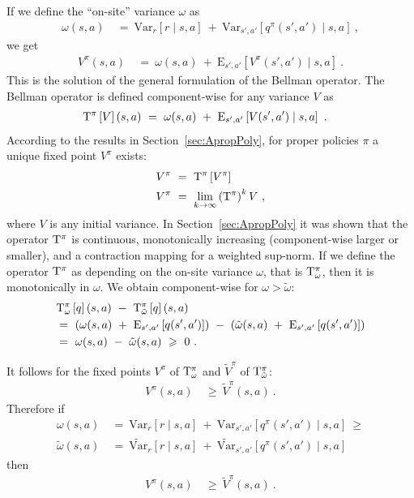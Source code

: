 \documentclass{article}
\newcommand\EXP{\mathbf{\mathrm{E}}}
\newcommand\VAR{\mathbf{\mathrm{Var}}}
\renewcommand{\geq}{\geqslant}
\begin{document}
\begin{appendices}
If we define the ``on-site'' variance $\omega$ as
\begin{align}
  \omega(s,a) \ &= \ \VAR_r \left[ r \mid s,a \right] \ + \
  \VAR_{s',a'} \left[q^\pi(s', a') \mid s,a\right] \ ,
\end{align}
we get
\begin{align}
  V^{\pi}(s,a) \ &= \  \omega(s,a)  \ + \ 
    \EXP_{s',a'}  \left[V^{\pi}(s',a') \mid s,a\right]  \ .  
\end{align}
This is the solution of the
general formulation of the
Bellman operator. The Bellman operator
is defined component-wise for any variance $V$ as
\begin{align}
  \rT^\pi \left[ V \right] (s,a) \ &= \
  \omega(s,a)  \ + \ 
    \EXP_{s',a'}  \left[V(s',a') \mid s,a\right]  \ . 
\end{align}
According to the results in Section~\ref{sec:ApropPoly},
for proper policies $\pi$ a unique fixed point $V^\pi$ exists:
\begin{align}
  V^\pi \ &= \ \mathrm{T}^\pi \left[ V^\pi\right] \\
  V^\pi \ &= \ \lim_{k\to \infty} \left(\mathrm{T}^\pi\right)^k V  \ ,
\end{align}
where $V$ is any initial variance.
In Section~\ref{sec:ApropPoly} it was shown that
the operator $\mathrm{T}^\pi$ is
continuous, monotonically increasing (component-wise larger or smaller),
and a contraction mapping for
a weighted sup-norm. If we define the operator $\mathrm{T}^\pi$ as depending on the on-site
variance $\omega$, that is
 $\mathrm{T}^\pi_{\omega}$, then it is monotonically in $\omega$. 
We obtain component-wise for $\omega>\tilde{\omega}$:
\begin{align}
  &\rT^\pi_{\omega} \left[ q \right](s,a)  \ - \  \rT^\pi_{\tilde{\omega}}
  \left[ q \right](s,a)   \\ \nonumber
  &= \ \left( \omega(s,a)
  \ + \ \EXP_{s',a'} \left[q(s',a')  \right] \right)  \ - \ \left( \tilde{\omega}(s,a)
  \ + \ \EXP_{s',a'} \left[q(s',a')  \right] \right)\\ \nonumber
  &= \ \omega(s,a) \ - \  \tilde{\omega}(s,a) \ \geq \ 0 \ .
\end{align}

It follows for the fixed points $V^{\pi}$ of $\mathrm{T}^\pi_{\omega}$ and
$\widetilde{V}^{\pi}$ of $\mathrm{T}^\pi_{\tilde{\omega}}$: 
\begin{align}
  V^{\pi}(s,a) \ &\geq \  \widetilde{V}^{\pi}(s,a) \ .
\end{align}
Therefore if 
\begin{align}
  \omega(s,a) \ &= \ \VAR_r \left[ r \mid s,a \right] \ + \
  \VAR_{s',a'} \left[q^\pi(s', a') \mid s,a\right]  \ \geq \\ \nonumber
  \tilde{\omega}(s,a) \ &= \ \widetilde{\VAR}_r \left[ r \mid s,a \right] \ + \
  \widetilde{\VAR}_{s',a'} \left[q^\pi(s', a') \mid s,a\right] 
\end{align}
then 
\begin{align}
  V^{\pi}(s,a) \ &\geq \  \widetilde{V}^{\pi}(s,a) \ .
\end{align}




\end{appendices}
\end{document}
